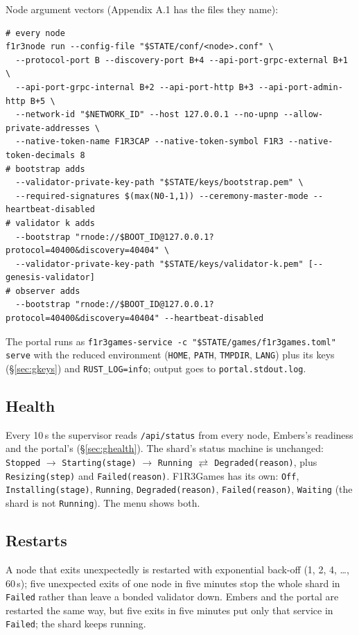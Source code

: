 \documentclass[11pt]{article}
\theoremstyle{definition}
\theoremstyle{remark}
\newcommand{\code}[1]{\texttt{#1}}
\newcommand{\Gm}{F1R3Games}
\newcommand{\Em}{Embers}
\begin{document}
\noindent
Node argument vectors (Appendix A.1 has the files they name):

\begin{lstlisting}
# every node
f1r3node run --config-file "$STATE/conf/<node>.conf" \
  --protocol-port B --discovery-port B+4 --api-port-grpc-external B+1 \
  --api-port-grpc-internal B+2 --api-port-http B+3 --api-port-admin-http B+5 \
  --network-id "$NETWORK_ID" --host 127.0.0.1 --no-upnp --allow-private-addresses \
  --native-token-name F1R3CAP --native-token-symbol F1R3 --native-token-decimals 8
# bootstrap adds
  --validator-private-key-path "$STATE/keys/bootstrap.pem" \
  --required-signatures $(max(N0-1,1)) --ceremony-master-mode --heartbeat-disabled
# validator k adds
  --bootstrap "rnode://$BOOT_ID@127.0.0.1?protocol=40400&discovery=40404" \
  --validator-private-key-path "$STATE/keys/validator-k.pem" [--genesis-validator]
# observer adds
  --bootstrap "rnode://$BOOT_ID@127.0.0.1?protocol=40400&discovery=40404" --heartbeat-disabled
\end{lstlisting}

\noindent
The portal runs as \code{f1r3games-service -c "\$STATE/games/f1r3games.toml" serve}
with the reduced environment (\code{HOME}, \code{PATH}, \code{TMPDIR}, \code{LANG})
plus its keys (\S\ref{sec:gkeys}) and \code{RUST\_LOG=info}; output goes to
\code{portal.stdout.log}.

\subsection{Health}
Every 10\,s the supervisor reads \code{/api/status} from every node, \Em{}'s readiness
and the portal's (\S\ref{sec:ghealth}). The shard's status machine is unchanged:
\code{Stopped} $\to$ \code{Starting(stage)} $\to$ \code{Running}
$\rightleftarrows$ \code{Degraded(reason)}, plus \code{Resizing(step)} and
\code{Failed(reason)}. \Gm{} has its own: \code{Off}, \code{Installing(stage)},
\code{Running}, \code{Degraded(reason)}, \code{Failed(reason)}, \code{Waiting} (the
shard is not \code{Running}). The menu shows both.

\subsection{Restarts}
A node that exits unexpectedly is restarted with exponential back-off (1, 2, 4,
\ldots, 60\,s); five unexpected exits of one node in five minutes stop the whole shard
in \code{Failed} rather than leave a bonded validator down. \Em{} and the portal are
restarted the same way, but five exits in five minutes put only that service in
\code{Failed}; the shard keeps running.
\end{document}
